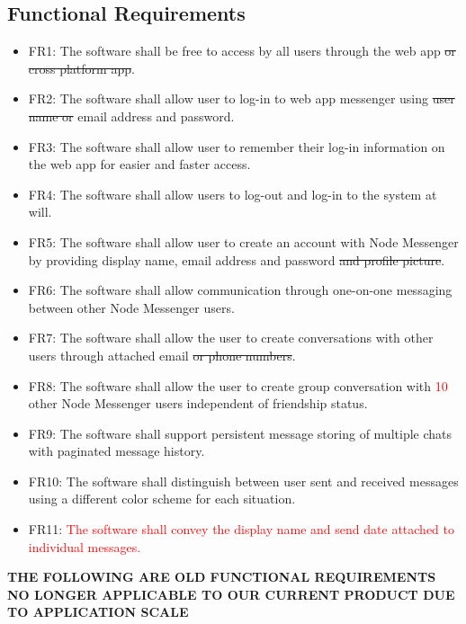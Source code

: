 \documentclass[12pt, titlepage]{article}
\begin{document}
    	\subsection{Functional Requirements}
	    \begin{itemize}
		    \item FR1: The software shall be free to access by all users through the web app \sout{or cross platform app}.
		    \item FR2: The software shall allow user to log-in to web app messenger using \sout{user name or} email address and password.
		    \item FR3: The software shall allow user to remember their log-in information on the web app for easier and faster access.
		    \item FR4: The software shall allow users to log-out and log-in to the system at will.
		    \item FR5: The software shall allow user to create an account with Node Messenger by providing display name, email address and password \sout{and profile picture}.
		    \item FR6: The software shall allow communication through one-on-one messaging between other Node Messenger users.
		    \item FR7: The software shall allow the user to create conversations with other users through attached email \sout{ or phone numbers}.
		    \item FR8: The software shall allow the user to create group conversation with \textcolor{red}{10} other Node Messenger users independent of friendship status.
		    \item FR9: The software shall support persistent message storing of multiple chats with paginated message history.
		    \item FR10: The software shall distinguish between user sent and received messages using a different color scheme for each situation.
		    \item FR11: \textcolor{red}{The software shall convey the display name and send date attached to individual messages.}
		    
	\end{itemize}
	
\textbf{THE FOLLOWING ARE OLD FUNCTIONAL REQUIREMENTS NO LONGER APPLICABLE TO OUR CURRENT PRODUCT DUE TO APPLICATION SCALE}\\
		
\end{document}
